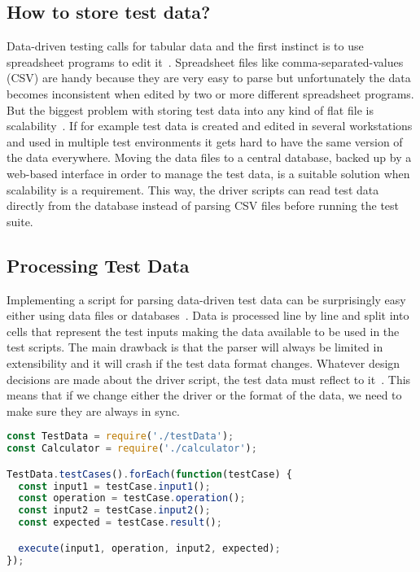 \subsection{How to store test data?}

Data-driven testing calls for tabular data and the first instinct is to use
spreadsheet programs to edit it~\cite{Lau07}. Spreadsheet files like
comma-separated-values (CSV) are handy because they are very easy to parse but
unfortunately the data becomes inconsistent when edited by two or more different
spreadsheet programs. But the biggest problem with storing test data into any
kind of flat file is scalability~\cite{Lau07}. If for example test data is
created and edited in several workstations and used in multiple test
environments it gets hard to have the same version of the data everywhere.
Moving the data files to a central database, backed up by a web-based
interface in order to manage the test data, is a suitable solution when
scalability is a requirement. This way, the driver scripts can read test data
directly from the database instead of parsing CSV files before running the
test suite.

\subsection{Processing Test Data}

Implementing a script for parsing data-driven test data can be surprisingly
easy either using data files or databases~\cite{Lau07}. Data is processed line
by line and split into cells that represent the test inputs making the data
available to be used in the test scripts. The main drawback is that the parser
will always be limited in extensibility and it will crash if the test data
format changes. Whatever design decisions are made about the driver script,
the test data must reflect to it~\cite{Fewster99}. This means that if we change
either the driver or the format of the data, we need to make sure they are
always in sync.

\begin{lstlisting}[caption={Example of data-driven driver script.},
    label={lst:lis1},language=JavaScript]
const TestData = require('./testData');
const Calculator = require('./calculator');

TestData.testCases().forEach(function(testCase) {
  const input1 = testCase.input1();
  const operation = testCase.operation();
  const input2 = testCase.input2();
  const expected = testCase.result();

  execute(input1, operation, input2, expected);
});
\end{lstlisting}

